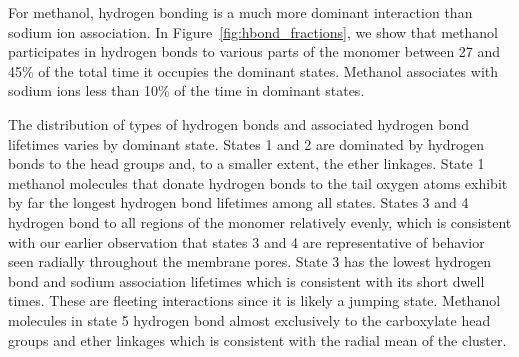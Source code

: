 \documentclass[journal=jpcbfk,manuscript=article]{achemso}
\begin{document}
  For methanol, hydrogen bonding is a much more dominant interaction than sodium
  ion association. In Figure~\ref{fig:hbond_fractions}, we show that methanol 
  participates in hydrogen bonds to various parts of the monomer between 27 and
  45\% of the total time it occupies the dominant states. Methanol associates 
  with sodium ions less than 10\% of the time in dominant states. 
  
  The distribution of types of hydrogen bonds and associated hydrogen bond lifetimes
  varies by dominant state. States 1 and 2 are dominated by hydrogen bonds to the 
  head groups and, to a smaller extent, the ether linkages. State 1 methanol
  molecules that donate hydrogen bonds to the tail oxygen atoms exhibit by far 
  the longest hydrogen bond lifetimes among all states. States 3 and 4 hydrogen 
  bond to all regions of the monomer relatively evenly, which is consistent with
  our earlier observation that states 3 and 4 are representative of behavior 
  seen radially throughout the membrane pores. State 3 has the lowest hydrogen 
  bond and sodium association lifetimes which is consistent with its short dwell
  times. These are fleeting interactions since it is likely a jumping state.
  Methanol molecules in state 5 hydrogen bond almost exclusively to the carboxylate
  head groups and ether linkages which is consistent with the radial mean of the
  cluster.
  
\end{document}
